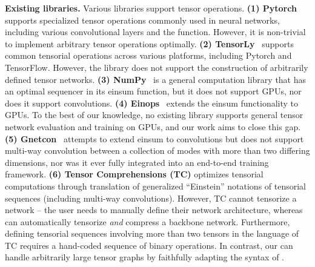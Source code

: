 \textbf{Existing libraries.}
Various libraries support tensor operations. \textbf{(1) Pytorch}~\citep{paszke2019pytorch} supports specialized tensor operations commonly used in neural networks, including various convolutional layers and the \einsum function. However, it is non-trivial to implement arbitrary tensor operations optimally. \textbf{(2) TensorLy}~\citep{kossaifi2019tensorly} supports common tensorial operations across various platforms, including Pytorch and TensorFlow. However, the library does not support the construction of arbitrarily defined tensor networks. \textbf{(3) NumPy}~\citep{harris2020array} is a general computation library that has an optimal sequencer in its einsum function, but it does not support GPUs, nor does it support convolutions.
\textbf{(4) Einops}~\citep{einops} extends the einsum functionality to GPUs.
To the best of our knowledge, no existing library supports general tensor network evaluation and training on GPUs, and our work aims to close this gap.
\textbf{(5) Gnetcon}~\citep{reustle2020fast} attempts to extend einsum to convolutions but does not support multi-way convolution between a collection of modes with more than two differing dimensions, nor was it ever fully integrated into an end-to-end training framework. \textbf{(6) Tensor Comprehensions (TC)} \citep{vasilache2018tensor} optimizes tensorial computations through translation of generalized ``Einstein'' notations of tensorial sequences (including multi-way convolutions). However, TC cannot tensorize a network -- the user needs to manually define their network architecture, whereas \autotnn can automatically tensorize \textit{and} compress a backbone network. Furthermore, defining tensorial sequences involving more than two tensors in the language of TC requires a hand-coded sequence of binary operations. In contrast, our \conveinsum can handle arbitrarily large tensor graphs by faithfully adapting the syntax of \einsum.
